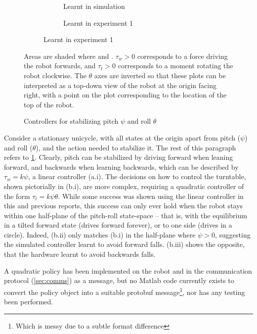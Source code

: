 \documentclass[main.tex]{subfiles}
\begin{document}
\begin{figure}[b!]
\begin{subfigure}[t]{\linewidth}
			\begin{subfigure}{(\linewidth - 2\ctlpadding)/3}
				\caption{Learnt in simulation}
			\end{subfigure}\hfill
			\begin{subfigure}{(\linewidth - 2\ctlpadding)/3}
				\caption{Learnt in experiment 1}
			\end{subfigure}
		\end{subfigure}
		\caption{Controllers for stabilizing pitch $\psi$ and roll $\theta$}
		\label{fig:balancing}
		\medskip
		\small
		Areas are shaded where  and .
		$\tau_w > 0$ corresponds to a force driving the robot forwards, and $\tau_t > 0$ corresponds to a moment rotating the robot clockwise.
		The $\theta$ axes are inverted so that these plots can be interpreted as a top-down view of the robot at the origin facing right, with a point on the plot corresponding to the location of the top of the robot.
	\end{figure}

	Consider a stationary unicycle, with all states at the origin apart from pitch ($\psi$) and roll ($\theta$), and the action needed to stabilize it.
	The rest of this paragraph refers to \cref{fig:balancing}.
	Clearly, pitch can be stabilized by driving forward when leaning forward, and backwards when learning backwards, which can be described by $\tau_w = k\psi$, a linear controller (a.i).
	The decisions on how to control the turntable, shown pictorially in (b.i), are more complex, requiring a quadratic controller of the form $\tau_t = k\psi\theta$.
	While some success was shown using the linear controller in this and previous reports, this success can only ever hold when the robot stays within one half-plane of the pitch-roll state-space -- that is, with the equilibrium in a tilted forward state (drives forward forever), or to one side (drives in a circle).
	Indeed, (b.ii) only matches (b.i) in the half-plane where $\psi > 0$, suggesting the simulated controller learnt to avoid forward falls. (b.iii) shows the opposite, that the hardware learnt to avoid backwards falls.

	A quadratic policy has been implemented on the robot and in the communication protocol (\cref{sec:comms}) as a  message, but no Matlab code currently exists to convert the {\Pilco} policy object into a suitable protobuf message\footnote{Which is messy due to a subtle format difference}, nor has any testing been performed.
\end{document}
